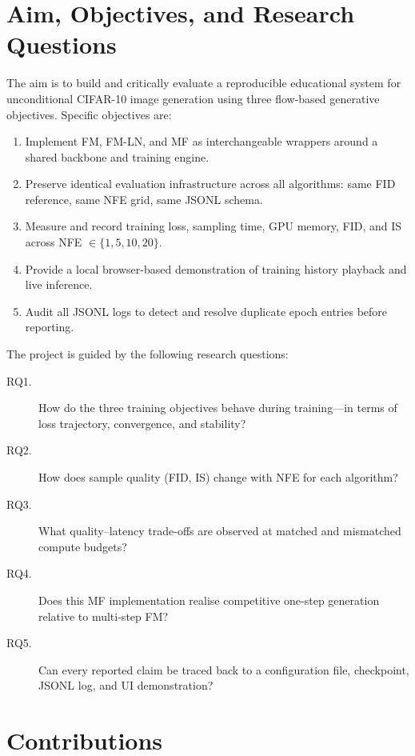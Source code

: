 \section{Aim, Objectives, and Research Questions}

The aim is to build and critically evaluate a reproducible educational system for
unconditional CIFAR-10 image generation using three flow-based generative
objectives. Specific objectives are:

\begin{enumerate}
  \item Implement FM, FM-LN, and MF as interchangeable wrappers around a shared
        backbone and training engine.
  \item Preserve identical evaluation infrastructure across all algorithms: same
        FID reference, same NFE grid, same JSONL schema.
  \item Measure and record training loss, sampling time, GPU memory, FID, and IS
        across NFE $\in\{1,5,10,20\}$.
  \item Provide a local browser-based demonstration of training history playback
        and live inference.
  \item Audit all JSONL logs to detect and resolve duplicate epoch entries before
        reporting.
\end{enumerate}

The project is guided by the following research questions:

\begin{description}
  \item[RQ1.] How do the three training objectives behave during training---in
              terms of loss trajectory, convergence, and stability?
  \item[RQ2.] How does sample quality (FID, IS) change with NFE for each
              algorithm?
  \item[RQ3.] What quality--latency trade-offs are observed at matched and
              mismatched compute budgets?
  \item[RQ4.] Does this MF implementation realise competitive one-step generation
              relative to multi-step FM?
  \item[RQ5.] Can every reported claim be traced back to a configuration file,
              checkpoint, JSONL log, and UI demonstration?
\end{description}

\section{Contributions}

